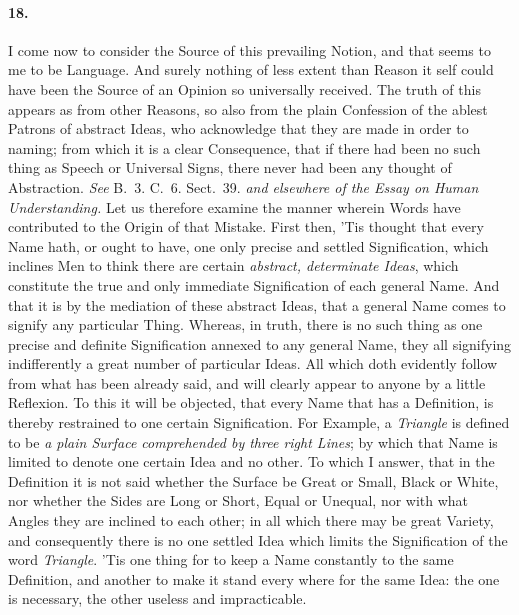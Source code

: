 \documentclass[]{article}
\newenvironment{sectionbody}{\begin{multicols}{2}}{\end{multicols}}
\begin{document}
\begin{sectionbody}
\paragraph{18.} I come now to consider the Source of this prevailing Notion, and
that seems to me to be Language.  And surely nothing of less
extent than Reason it self could have been the Source of an
Opinion so universally received.  The truth of this appears as
from other Reasons, so also from the plain Confession of the
ablest Patrons of abstract Ideas, who acknowledge that they are
made in order to naming; from which it is a clear Consequence,
that if there had been no such thing as Speech or Universal
Signs, there never had been any thought of Abstraction.
\emph{See} B.~3. C.~6. Sect.~39.
\emph{and elsewhere of the Essay on Human Understanding.} Let
us therefore examine the manner wherein Words have contributed to
the Origin of that Mistake.  First then, 'Tis thought that every
Name hath, or ought to have, one only precise and settled
Signification, which inclines Men to think there are certain
\emph{abstract, determinate Ideas}, which constitute the true
and only immediate Signification of each general Name.  And that
it is by the mediation of these abstract Ideas, that a general
Name comes to signify any particular Thing.  Whereas, in truth,
there is no such thing as one precise and definite Signification
annexed to any general Name, they all signifying indifferently a
great number of particular Ideas.  All which doth evidently
follow from what has been already said, and will clearly appear
to anyone by a little Reflexion.  To this it will be objected,
that every Name that has a Definition, is thereby restrained to
one certain Signification.  For Example, a \emph{Triangle} is
defined to be \emph{a plain Surface comprehended by three right
Lines}; by which that Name is limited to denote one certain
Idea and no other.  To which I answer, that in the Definition it
is not said whether the Surface be Great or Small, Black or
White, nor whether the Sides are Long or Short, Equal or Unequal,
nor with what Angles they are inclined to each other; in all
which there may be great Variety, and consequently there is no
one settled Idea which limits the Signification of the word
\emph{Triangle}.  'Tis one thing for to keep a Name constantly
to the same Definition, and another to make it stand every where
for the same Idea: the one is necessary, the other useless and
impracticable.




\end{sectionbody}
\end{document}
